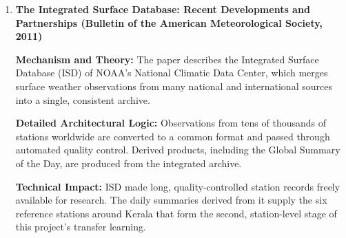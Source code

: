 \begin{enumerate}
\textbf{Technical Impact:} TrOCR achieves state-of-the-art accuracy on printed and handwritten text-line benchmarks. Its handwritten checkpoints were the recognisers tested zero-shot on the SJCET register, where they read only about a third of the cells correctly, because isolated numerals in ruled cells differ from the text lines they were trained on.

\item \textbf{The Integrated Surface Database: Recent Developments and Partnerships (Bulletin of the American Meteorological Society, 2011)}

\textbf{Mechanism and Theory:} The paper describes the Integrated Surface Database (ISD) of NOAA's National Climatic Data Center, which merges surface weather observations from many national and international sources into a single, consistent archive.

\textbf{Detailed Architectural Logic:} Observations from tens of thousands of stations worldwide are converted to a common format and passed through automated quality control. Derived products, including the Global Summary of the Day, are produced from the integrated archive.

\textbf{Technical Impact:} ISD made long, quality-controlled station records freely available for research. The daily summaries derived from it supply the six reference stations around Kerala that form the second, station-level stage of this project's transfer learning.

\end{enumerate}
